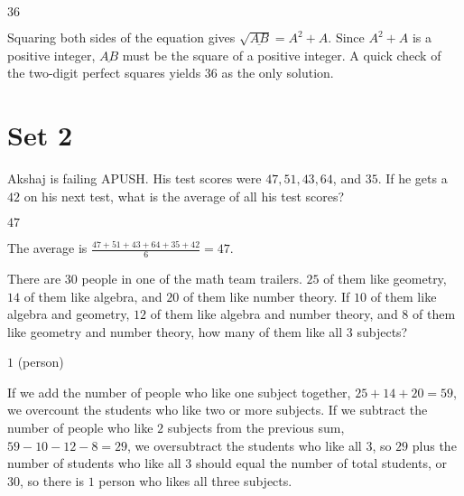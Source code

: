 \documentclass[11pt]{article}
\begin{document}
\begin{answer}
$\boxed{36}$
\end{answer}

\begin{solution}
Squaring both sides of the equation gives $\sqrt{\underline{AB}} = A^2 + A$. Since $A^2 + A$ is a positive integer, $\underline{AB}$ must be the square of a positive integer. A quick check of the two-digit perfect squares yields $\boxed{36}$ as the only solution.
\end{solution}

\newpage


\section*{Set 2}

\begin{problem}%
Akshaj is failing APUSH. His test scores were $47, 51, 43, 64$, and $35$. If he gets a $42$ on his next test, what is the average of all his test scores?
\end{problem}

\begin{answer}
$\boxed{47}$
\end{answer}

\begin{solution}
The average is $\frac{47 + 51 + 43 + 64 + 35 + 42}{6} = \boxed{47}$.
\end{solution}


\begin{problem}%
There are $30$ people in one of the math team trailers. $25$ of them like geometry, $14$ of them like algebra, and $20$ of them like number theory. If $10$ of them like algebra and geometry, $12$ of them like algebra and number theory, and $8$ of them like geometry and number theory, how many of them like all $3$ subjects?
\end{problem}

\begin{answer}
$\boxed{1}$ (person)
\end{answer}

\begin{solution}
If we add the number of people who like one subject together, $25 + 14 + 20 = 59$, we overcount the students who like two or more subjects. If we subtract the number of people who like $2$ subjects from the previous sum, $59 - 10 - 12 - 8 = 29$, we oversubtract the students who like all $3$, so $29$ plus the number of students who like all $3$ should equal the number of total students, or $30$, so there is $\boxed{1}$ person who likes all three subjects.
\end{solution}
\end{document}
